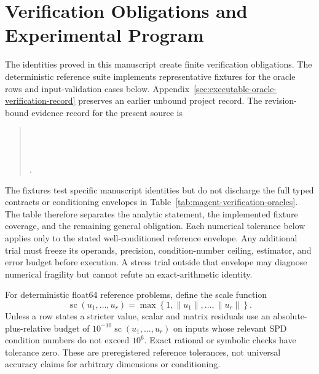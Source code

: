 \chapter[Verification Obligations and Experimental Program]{Verification Obligations and\\Experimental Program}
\label{ch:verification-program}

The identities proved in this manuscript create finite verification obligations. The deterministic reference suite implements representative fixtures for the oracle rows and input-validation cases below. Appendix~\ref{sec:executable-oracle-verification-record} preserves an earlier unbound project record. The revision-bound evidence record for the present source is
\begin{quote}
\small
{}\\
\\
\\
.
\end{quote}
The fixtures test specific manuscript identities but do not discharge the full typed contracts or conditioning envelopes in Table~\ref{tab:magent-verification-oracles}. The table therefore separates the analytic statement, the implemented fixture coverage, and the remaining general obligation. Each numerical tolerance below applies only to the stated well-conditioned reference envelope. Any additional trial must freeze its operands, precision, condition-number ceiling, estimator, and error budget before execution. A stress trial outside that envelope may diagnose numerical fragility but cannot refute an exact-arithmetic identity.

For deterministic float64 reference problems, define the scale function
\begin{equation}
\operatorname{sc}(u_1,\ldots,u_r)
=\max\left\{1,\lVert u_1\rVert,\ldots,\lVert u_r\rVert\right\}.
\label{eq:verification-scale-function}
\end{equation}
Unless a row states a stricter value, scalar and matrix residuals use an absolute-plus-relative budget of \(10^{-10}\operatorname{sc}(u_1,\ldots,u_r)\) on inputs whose relevant SPD condition numbers do not exceed \(10^6\). Exact rational or symbolic checks have tolerance zero. These are preregistered reference tolerances, not universal accuracy claims for arbitrary dimensions or conditioning.

